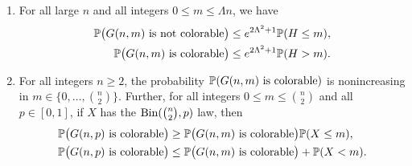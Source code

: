 \begin{lemma}\label{lem:conv-transfer}
\begin{enumerate}[label=(\alph*)]
\item For all large $n$ and all integers $0 \le m \le \Lambda n$, we have
\begin{equation}\label{eq:conv-transfer-a}
\begin{aligned}
\mathbb P\big(G(n, m) \text{ is not colorable}\big) &\le e^{2\Lambda^2 + 1} \mathbb P(H \le m), \\
\mathbb P\big(G(n, m) \text{ is colorable}\big) &\le e^{2\Lambda^2 + 1} \mathbb P(H > m).
\end{aligned}
\end{equation}
\item For all integers $n \ge 2$, the probability $\mathbb P(G(n, m) \text{ is colorable})$ is nonincreasing in $m \in \{0, \dots, \binom{n}{2}\}$. Further, for all integers $0 \le m \le \binom{n}{2}$ and all $p \in [0, 1]$, if $X$ has the $\operatorname{Bin}(\binom{n}{2}, p)$ law, then
\begin{equation}\label{eq:conv-transfer-b}
\begin{aligned}
\mathbb P\big(G(n, p) \text{ is colorable}\big) &\ge \mathbb P\big(G(n, m) \text{ is colorable}\big) \mathbb P(X \le m), \\
\mathbb P\big(G(n, p) \text{ is colorable}\big) &\le \mathbb P\big(G(n, m) \text{ is colorable}\big) + \mathbb P(X < m).
\end{aligned}
\end{equation}
\end{enumerate}
\end{lemma}

